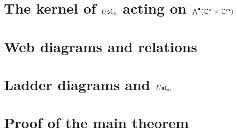 \documentclass[11pt,leqno]{article}
\begin{document}
\section{The kernel of $U\mathfrak{sl}_{m}$ acting on $\bigwedge^\bullet(\mathbb C^{n} \times \mathbb C^m)$}
\label{sec:kernel}

\section{Web diagrams and relations}
\label{sec:diagrams}

\section{Ladder diagrams and $U\mathfrak{sl}_{m}$}
\label{sec:ladders}

\section{Proof of the main theorem}
\label{sec:theorem}




\end{document}

